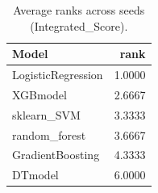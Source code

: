 \begin{table}[t]
\centering
\begin{tabular}{lr}
\toprule
Model & rank \\
\midrule
LogisticRegression & 1.0000 \\
XGBmodel & 2.6667 \\
sklearn_SVM & 3.3333 \\
random_forest & 3.6667 \\
GradientBoosting & 4.3333 \\
DTmodel & 6.0000 \\
\bottomrule
\end{tabular}
\caption{Average ranks across seeds (Integrated_Score).}
\label{tab:avg_rank_Integrated_Score}
\end{table}